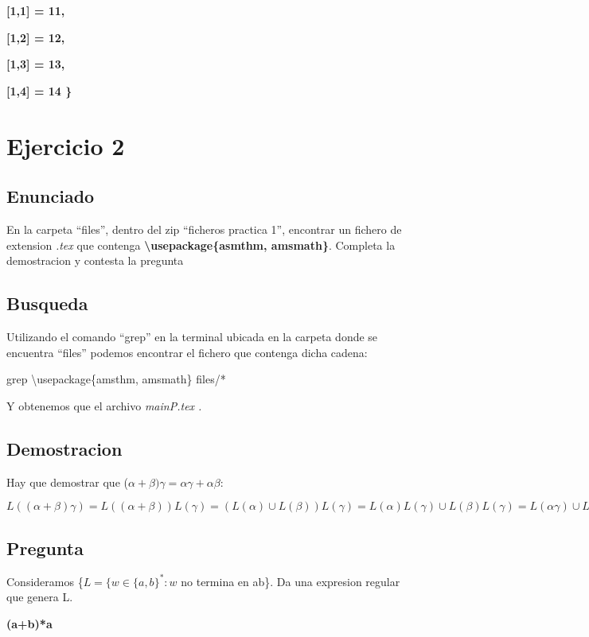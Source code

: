 \documentclass[english]{article}
\begin{document}
\textbf{{[}1,1{]} = 11, }

\textbf{{[}1,2{]} = 12, }

\textbf{{[}1,3{]} = 13, }

\textbf{{[}1,4{]} = 14 \}}

\section{{\LARGE{}Ejercicio 2}}

\subsection{{\Large{}Enunciado}}

En la carpeta ``files'', dentro del zip ``ficheros practica 1'',
encontrar un fichero de extension \textit{.tex }que contenga \textbf{\textbackslash usepackage\{asmthm,
amsmath\}}. Completa la demostracion y contesta la pregunta

\subsection{{\Large{}Busqueda}}

Utilizando el comando ``grep'' en la terminal ubicada en la carpeta
donde se encuentra ``files'' podemos encontrar el fichero que contenga
dicha cadena:
\begin{doublespace}
\noindent \begin{center}
grep \textquotedbl\textbackslash usepackage\{amsthm, amsmath\}\textquotedbl{}
files/{*} 
\par\end{center}
\end{doublespace}

\noindent Y obtenemos que el archivo \textit{mainP.tex .}

\subsection{{\Large{}Demostracion}}

Hay que demostrar que ($\alpha+\beta)\gamma=\alpha\gamma+\alpha\beta$:
\begin{center}
$L((\alpha+\beta)\gamma)=L((\alpha+\beta))L(\gamma)=(L(\alpha)\cup L(\beta))L(\gamma)=L(\alpha)L(\gamma)\cup L(\beta)L(\gamma)=L(\alpha\gamma)\cup L(\beta\gamma)=L(\alpha\gamma+\alpha\beta)$
\par\end{center}

\subsection{{\Large{}Pregunta}}

Consideramos \{$L=\{w\in\{a,b\}^{*}:w$ no termina en ab\}. Da una
expresion regular que genera L.
\begin{center}
\textbf{(a+b){*}a}
\par\end{center}
\end{document}
